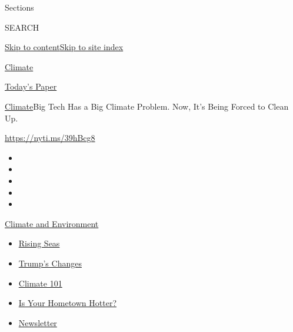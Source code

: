 Sections

SEARCH

\protect\hyperlink{site-content}{Skip to
content}\protect\hyperlink{site-index}{Skip to site index}

\href{https://www.nytimes3xbfgragh.onion/section/climate}{Climate}

\href{https://myaccount.nytimes3xbfgragh.onion/auth/login?response_type=cookie\&client_id=vi}{}

\href{https://www.nytimes3xbfgragh.onion/section/todayspaper}{Today's
Paper}

\href{/section/climate}{Climate}\textbar{}Big Tech Has a Big Climate
Problem. Now, It's Being Forced to Clean Up.

\href{https://nyti.ms/39hBcg8}{https://nyti.ms/39hBcg8}

\begin{itemize}
\item
\item
\item
\item
\item
\end{itemize}

\href{https://www.nytimes3xbfgragh.onion/section/climate?action=click\&pgtype=Article\&state=default\&region=TOP_BANNER\&context=storylines_menu}{Climate
and Environment}

\begin{itemize}
\tightlist
\item
  \href{https://www.nytimes3xbfgragh.onion/2020/07/30/climate/sea-level-inland-floods.html?action=click\&pgtype=Article\&state=default\&region=TOP_BANNER\&context=storylines_menu}{Rising
  Seas}
\item
  \href{https://www.nytimes3xbfgragh.onion/interactive/2020/climate/trump-environment-rollbacks.html?action=click\&pgtype=Article\&state=default\&region=TOP_BANNER\&context=storylines_menu}{Trump's
  Changes}
\item
  \href{https://www.nytimes3xbfgragh.onion/interactive/2020/04/19/climate/climate-crash-course-1.html?action=click\&pgtype=Article\&state=default\&region=TOP_BANNER\&context=storylines_menu}{Climate
  101}
\item
  \href{https://www.nytimes3xbfgragh.onion/interactive/2018/08/30/climate/how-much-hotter-is-your-hometown.html?action=click\&pgtype=Article\&state=default\&region=TOP_BANNER\&context=storylines_menu}{Is
  Your Hometown Hotter?}
\item
  \href{https://www.nytimes3xbfgragh.onion/newsletters/climate-change?action=click\&pgtype=Article\&state=default\&region=TOP_BANNER\&context=storylines_menu}{Newsletter}
\end{itemize}

